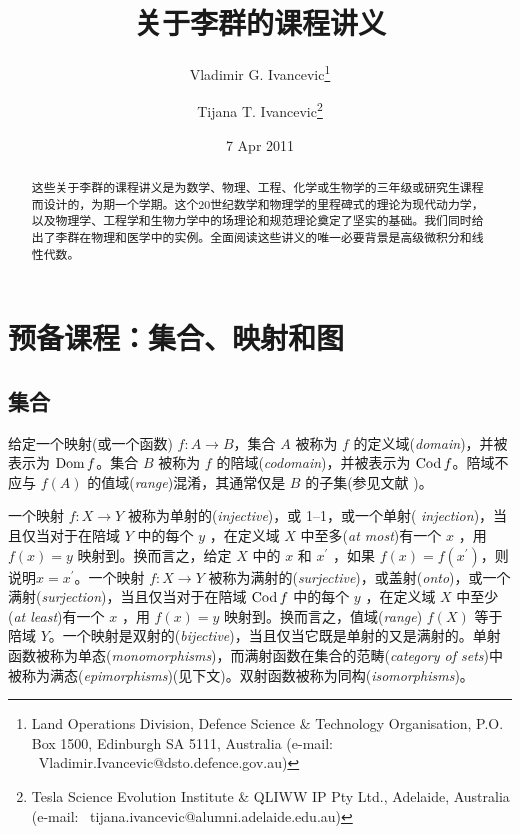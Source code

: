 \documentclass[11pt,fontset=founder]{ctexart}
\begin{document}
\title{关于李群的课程讲义}
\author{Vladimir G. Ivancevic\thanks{%
Land Operations Division, Defence Science \& Technology Organisation, P.O.
Box 1500, Edinburgh SA 5111, Australia \quad\quad (e-mail:
~Vladimir.Ivancevic@dsto.defence.gov.au)} \and Tijana T. Ivancevic\thanks{%
Tesla Science Evolution Institute \& QLIWW IP Pty Ltd., Adelaide, Australia
\quad\quad (e-mail: ~tijana.ivancevic@alumni.adelaide.edu.au)}}
\date{7 Apr 2011}
\maketitle

\begin{abstract}
这些关于李群的课程讲义是为数学、物理、工程、化学或生物学的三年级或研究生课程而设计的，为期一个学期。这个20世纪数学和物理学的里程碑式的理论为现代动力学，以及物理学、工程学和生物力学中的场理论和规范理论奠定了坚实的基础。我们同时给出了李群在物理和医学中的实例。全面阅读这些讲义的唯一必要背景是高级微积分和线性代数。
\end{abstract}

\tableofcontents

\section{预备课程：集合、映射和图}

\subsection{集合}

给定一个映射(或一个函数) $f:A\rightarrow B$，集合 $A$ 被称为 $f$ 的定义域(\emph{domain})，并被表示为 $\mathop{\rm Dom}f$。集合 $B$ 被称为 $f$ 的陪域(\emph{codomain})，并被表示为 $\mathop{\rm Cod}f$。陪域不应与 $f(A)$ 的值域(\emph{range})混淆，其通常仅是 $B$ 的子集(参见文献 \cite{GaneshSprBig,GaneshADG})。

一个映射 $f:X\rightarrow Y$ 被称为单射的(\emph{injective})，或 1--1，或一个单射(\emph{%
injection})，当且仅当对于在陪域 $Y$ 中的每个 $y$ ，在定义域 $X$ 中至多(\emph{at most})有一个 $x$ ，用 $f(x)=y$ 映射到。换而言之，给定 $X$ 中的 $x$ 和 $%
x^{\prime }$ ，如果 $f(x)=f(x^{\prime })$，则说明$%
x=x^{\prime }$。一个映射 $f:X\rightarrow Y$ 被称为满射的(\emph{surjective})，或盖射(\emph{onto})，或一个满射(\emph{surjection})，当且仅当对于在陪域 $%
\limfunc{Cod}f$ 中的每个 $y $ ，在定义域 $X$ 中至少(\emph{at least})有一个 $x$ ，用 $f(x)=y$ 映射到。换而言之，值域(\emph{range}) $f(X)$ 等于陪域 $Y$。一个映射是双射的(\emph{bijective})，当且仅当它既是单射的又是满射的。单射函数被称为单态(\emph{monomorphisms})，而满射函数在集合的范畴(\emph{category of
sets})中被称为满态(\emph{epimorphisms})(见下文)。双射函数被称为同构(\emph{isomorphisms})。
\end{document}
